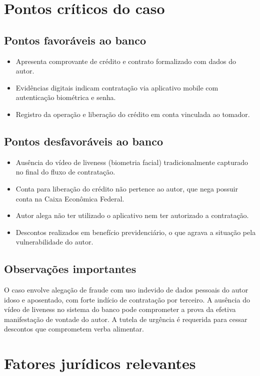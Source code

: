 \documentclass[12pt]{article}
\begin{document}
\section*{Pontos críticos do caso}
\subsection*{Pontos favoráveis ao banco}
\begin{itemize}
\item Apresenta comprovante de crédito e contrato formalizado com dados do autor.
\item Evidências digitais indicam contratação via aplicativo mobile com autenticação biométrica e senha.
\item Registro da operação e liberação do crédito em conta vinculada ao tomador.
\end{itemize}

\subsection*{Pontos desfavoráveis ao banco}
\begin{itemize}
\item Ausência do vídeo de liveness (biometria facial) tradicionalmente capturado no final do fluxo de contratação.
\item Conta para liberação do crédito não pertence ao autor, que nega possuir conta na Caixa Econômica Federal.
\item Autor alega não ter utilizado o aplicativo nem ter autorizado a contratação.
\item Descontos realizados em benefício previdenciário, o que agrava a situação pela vulnerabilidade do autor.
\end{itemize}

\subsection*{Observações importantes}
O caso envolve alegação de fraude com uso indevido de dados pessoais do autor idoso e aposentado, com forte indício de contratação por terceiro. A ausência do vídeo de liveness no sistema do banco pode comprometer a prova da efetiva manifestação de vontade do autor. A tutela de urgência é requerida para cessar descontos que comprometem verba alimentar.

\section*{Fatores jurídicos relevantes}
\end{document}
